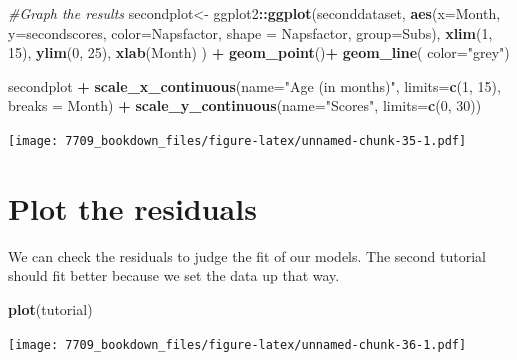 \documentclass[]{book}
\newenvironment{Shaded}{\begin{snugshade}}{\end{snugshade}}
\newcommand{\CommentTok}[1]{\textcolor[rgb]{0.56,0.35,0.01}{\textit{#1}}}
\newcommand{\DataTypeTok}[1]{\textcolor[rgb]{0.13,0.29,0.53}{#1}}
\newcommand{\DecValTok}[1]{\textcolor[rgb]{0.00,0.00,0.81}{#1}}
\newcommand{\KeywordTok}[1]{\textcolor[rgb]{0.13,0.29,0.53}{\textbf{#1}}}
\newcommand{\NormalTok}[1]{#1}
\newcommand{\OperatorTok}[1]{\textcolor[rgb]{0.81,0.36,0.00}{\textbf{#1}}}
\newcommand{\StringTok}[1]{\textcolor[rgb]{0.31,0.60,0.02}{#1}}
\begin{document}
\begin{Shaded}
\begin{Highlighting}[]
\CommentTok{#Graph the results }
\NormalTok{secondplot<-}
\NormalTok{ggplot2}\OperatorTok{::}\KeywordTok{ggplot}\NormalTok{(seconddataset, }\KeywordTok{aes}\NormalTok{(}\DataTypeTok{x=}\NormalTok{Month, }\DataTypeTok{y=}\NormalTok{secondscores,  }\DataTypeTok{color=}\NormalTok{Napsfactor, }\DataTypeTok{shape =}\NormalTok{ Napsfactor, }\DataTypeTok{group=}\NormalTok{Subs), }\KeywordTok{xlim}\NormalTok{(}\DecValTok{1}\NormalTok{, }\DecValTok{15}\NormalTok{), }\KeywordTok{ylim}\NormalTok{(}\DecValTok{0}\NormalTok{, }\DecValTok{25}\NormalTok{), }\KeywordTok{xlab}\NormalTok{(Month) ) }\OperatorTok{+}\StringTok{ }
\StringTok{  }\KeywordTok{geom_point}\NormalTok{()}\OperatorTok{+}
\StringTok{  }\KeywordTok{geom_line}\NormalTok{( }\DataTypeTok{color=}\StringTok{"grey"}\NormalTok{)}

\NormalTok{secondplot }\OperatorTok{+}\StringTok{ }\KeywordTok{scale_x_continuous}\NormalTok{(}\DataTypeTok{name=}\StringTok{"Age (in months)"}\NormalTok{, }\DataTypeTok{limits=}\KeywordTok{c}\NormalTok{(}\DecValTok{1}\NormalTok{, }\DecValTok{15}\NormalTok{), }\DataTypeTok{breaks =}\NormalTok{ Month) }\OperatorTok{+}
\StringTok{  }\KeywordTok{scale_y_continuous}\NormalTok{(}\DataTypeTok{name=}\StringTok{"Scores"}\NormalTok{, }\DataTypeTok{limits=}\KeywordTok{c}\NormalTok{(}\DecValTok{0}\NormalTok{, }\DecValTok{30}\NormalTok{))}
\end{Highlighting}
\end{Shaded}

\texttt{[image: 7709\_bookdown\_files/figure-latex/unnamed-chunk-35-1.pdf]}

\hypertarget{plot-the-residuals}{%
\section{Plot the residuals}\label{plot-the-residuals}}

We can check the residuals to judge the fit of our models. The second tutorial should fit better because we set the data up that way.

\begin{Shaded}
\begin{Highlighting}[]
\KeywordTok{plot}\NormalTok{(tutorial)}
\end{Highlighting}
\end{Shaded}

\texttt{[image: 7709\_bookdown\_files/figure-latex/unnamed-chunk-36-1.pdf]}
\end{document}
